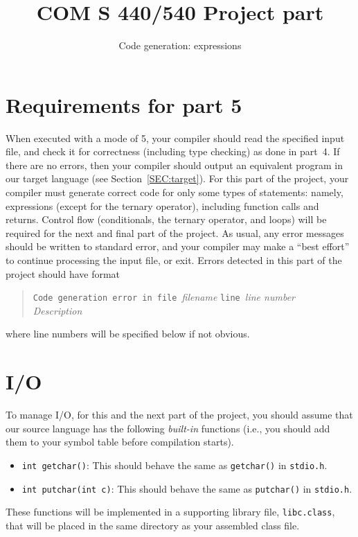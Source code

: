 \documentclass{article}
\title{COM S 440/540 Project part \codegen}
\author{Code generation: expressions}
\date{}
\newcommand{\typecheck}{4}
\newcommand{\codegen}{5}
\begin{document}
\maketitle

\section{Requirements for part \codegen}

When executed with a mode of \codegen,
your compiler should read the specified input file,
and check it for correctness (including type checking) as done in part~\typecheck.
If there are no errors, then your compiler should output
an equivalent program in our target language
(see Section~\ref{SEC:target}).
For this part of the project,
your compiler must generate correct code for only some types of
statements:
namely, expressions (except for the ternary operator),
including function calls and returns.
Control flow (conditionals, the ternary operator, and loops)
will be required for the next and final part of the project.
As usual,
any error messages should be written to standard error,
and your compiler may make a ``best effort'' to continue processing
the input file, or exit.
Errors detected in this part of the project should have format
\begin{quote}
  \begin{tabbing}
		{\tt Code ge}\={\tt neration error in file }\emph{filename}
		{\tt line }\emph{line number}
	\\
		\> \emph{Description}
  \end{tabbing}
\end{quote}
where line numbers will be specified below if not obvious.




\section{I/O}

To manage I/O,
for this and the next part of the project,
you should assume that our source language has
the following \emph{built-in} functions
(i.e., you should add them to your symbol table before compilation starts).
\begin{itemize}
  \item \lstinline|int getchar()|:
    This should behave the same as {\tt getchar()} in {\tt stdio.h}.

  \item \lstinline|int putchar(int c)|:
    This should behave the same as {\tt putchar()} in {\tt stdio.h}.
\end{itemize}
These functions will be implemented in a supporting library file,
{\tt libc.class}, that will be placed in the same directory
as your assembled class file.
\end{document}
